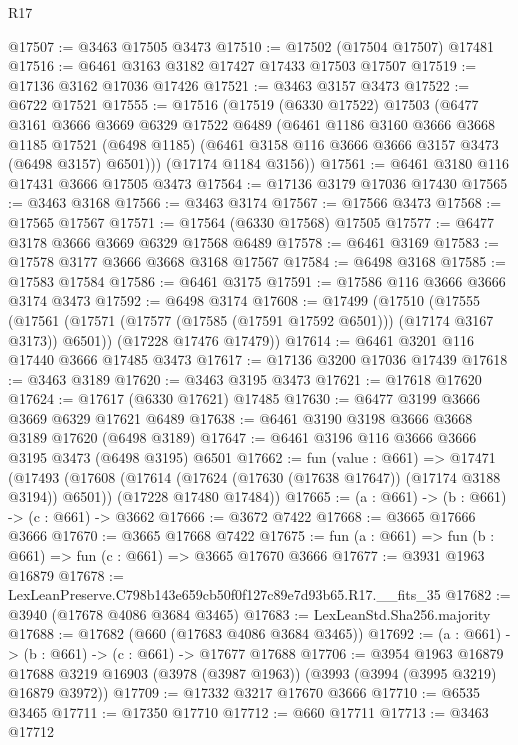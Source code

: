 \begin{lexlean}{R17}
\begin{coremodule}
@17507 := @3463 @17505 @3473
@17510 := @17502 (@17504 @17507) @17481
@17516 := @6461 @3163 @3182 @17427 @17433 @17503 @17507
@17519 := @17136 @3162 @17036 @17426
@17521 := @3463 @3157 @3473
@17522 := @6722 @17521
@17555 := @17516
    (@17519
      (@6330 @17522)
      @17503
      (@6477
        @3161
        @3666
        @3669
        @6329
        @17522
        @6489
        (@6461
          @1186
          @3160
          @3666
          @3668
          @1185
          @17521
          (@6498 @1185)
          (@6461 @3158 @116 @3666 @3666 @3157 @3473 (@6498 @3157) @6501)))
      (@17174 @1184 @3156))
@17561 := @6461 @3180 @116 @17431 @3666 @17505 @3473
@17564 := @17136 @3179 @17036 @17430
@17565 := @3463 @3168
@17566 := @3463 @3174
@17567 := @17566 @3473
@17568 := @17565 @17567
@17571 := @17564 (@6330 @17568) @17505
@17577 := @6477 @3178 @3666 @3669 @6329 @17568 @6489
@17578 := @6461 @3169
@17583 := @17578 @3177 @3666 @3668 @3168 @17567
@17584 := @6498 @3168
@17585 := @17583 @17584
@17586 := @6461 @3175
@17591 := @17586 @116 @3666 @3666 @3174 @3473
@17592 := @6498 @3174
@17608 := @17499
    (@17510
      (@17555 (@17561 (@17571 (@17577 (@17585 (@17591 @17592 @6501))) (@17174 @3167 @3173)) @6501))
      (@17228 @17476 @17479))
@17614 := @6461 @3201 @116 @17440 @3666 @17485 @3473
@17617 := @17136 @3200 @17036 @17439
@17618 := @3463 @3189
@17620 := @3463 @3195 @3473
@17621 := @17618 @17620
@17624 := @17617 (@6330 @17621) @17485
@17630 := @6477 @3199 @3666 @3669 @6329 @17621 @6489
@17638 := @6461 @3190 @3198 @3666 @3668 @3189 @17620 (@6498 @3189)
@17647 := @6461 @3196 @116 @3666 @3666 @3195 @3473 (@6498 @3195) @6501
@17662 := fun (value : @661) =>
  @17471
    (@17493
      (@17608 (@17614 (@17624 (@17630 (@17638 @17647)) (@17174 @3188 @3194)) @6501))
      (@17228 @17480 @17484))
@17665 := (a : @661) -> (b : @661) -> (c : @661) -> @3662
@17666 := @3672 @7422
@17668 := @3665 @17666 @3666
@17670 := @3665 @17668 @7422
@17675 := fun (a : @661) => fun (b : @661) => fun (c : @661) => @3665 @17670 @3666
@17677 := @3931 @1963 @16879
@17678 := LexLeanPreserve.C798b143e659cb50f0f127c89e7d93b65.R17.__fits_35
@17682 := @3940 (@17678 @4086 @3684 @3465)
@17683 := LexLeanStd.Sha256.majority
@17688 := @17682 (@660 (@17683 @4086 @3684 @3465))
@17692 := (a : @661) -> (b : @661) -> (c : @661) -> @17677 @17688
@17706 := @3954
    @1963
    @16879
    @17688
    @3219
    @16903
    (@3978 (@3987 @1963))
    (@3993 (@3994 (@3995 @3219) @16879 @3972))
@17709 := @17332 @3217 @17670 @3666
@17710 := @6535 @3465
@17711 := @17350 @17710
@17712 := @660 @17711
@17713 := @3463 @17712

\end{coremodule}
\end{lexlean}
